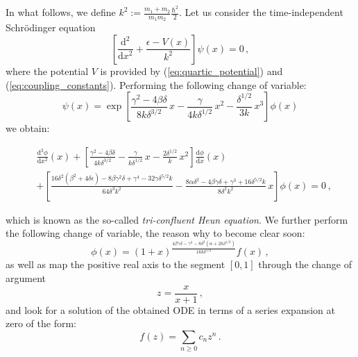\documentclass[reprint, amsmath, amssymb, aps, prl]{revtex4-2}
\begin{document}
    In what follows, we define $k^2:=\frac{m_1+m_2}{m_1 m_2}\frac{\hbar^2}{2}$.
    Let us consider the time-independent Schr\"odinger equation
    \begin{equation}
        \left[\frac{\text{d}^2}{\text{d}x^2} + \frac{\epsilon - V(x)}{k^2}\right]\psi(x) = 0\,,
    \end{equation}
    where the potential $V$ is provided by (\ref{eq:quartic_potential}) and (\ref{eq:coupling_constants}).
    Performing the following change of variable:
    \begin{equation}
        \psi(x)=\exp\left[\frac{\gamma^2-4\beta\delta}{8k\delta^{3/2}}\,x-\frac{\gamma}{4k\delta^{1/2}}\,x^2-\frac{\delta^{1/2}}{3k}\,x^3\right]\phi(x)
    \end{equation}
    we obtain:
    \begin{widetext}
    \begin{equation}
    \begin{split}
        &\frac{\text{d}^2\phi}{\text{d}x^2}(x)+\left[\frac{\gamma^2-4\beta\delta}{4k\delta^{3/2}}-\frac{\gamma}{k\delta^{1/2}}\,x-\frac{2\delta^{1/2}}{k}\,x^2\right]\frac{\text{d}\phi}{\text{d}x}(x)\\
        &+\left[\frac{16 \delta ^2 \left(\beta ^2+4 \delta  \epsilon \right)-8 \beta  \gamma ^2 \delta +\gamma ^4-32 \gamma  \delta ^{5/2} k}{64 \delta ^3 k^2}-\frac{8 \alpha  \delta ^2-4 \beta  \gamma  \delta +\gamma ^3+16 \delta ^{5/2} k}{8 \delta ^2 k^2}\,x\right]\phi(x)=0\,,
    \end{split}
    \end{equation}
    \end{widetext}
    which is known as the so-called \textit{tri-confluent Heun equation}.
    We further perform the following change of variable, the reason why to become clear soon:
    \begin{equation}
        \phi(x)=(1+x)^{\frac{4 \beta  \gamma  \delta -\gamma ^3-8 \delta ^2 \left(\alpha +2k \delta^{1/2} \right)}{16k \delta ^{5/2}}}f(x)\,,
    \end{equation}
    as well as map the positive real axis to the segment $[0,1]$ through the change of argument
    \begin{equation}
        z=\frac{x}{x+1}\,,
    \end{equation}
    and look for a solution of the obtained ODE in terms of a series expansion at zero of the form:
    \begin{equation}
        f(z)=\sum_{n\geq 0}c_nz^n\,.
    \end{equation}
\end{document}
